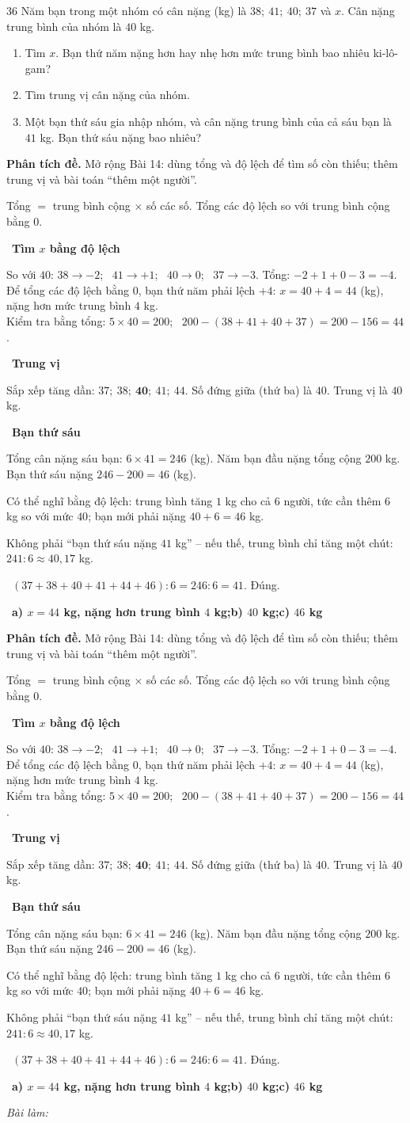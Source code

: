 \documentclass[11pt]{article}
\newif\ifsol \soltrue
\providecommand{\AnsWord}{Đáp số}
\newcommand{\ans}[1]{\par\smallskip{\bfseries\color{tmGreen!88!black}\AnsWord:}\ {\bfseries\color{AnsRed}#1}\par}
\newcommand{\probsol}[1]{%
  \begin{lrbox}{\solmeasure}\begin{minipage}{\dimexpr\linewidth-24pt\relax}#1\end{minipage}\end{lrbox}%
  \ifsol
    \begin{solbox}#1\end{solbox}%
  \else
    \setlength{\solht}{\dimexpr\ht\solmeasure+\dp\solmeasure+0.85cm\relax}%
    \ifdim\solht<1.35cm\setlength{\solht}{1.35cm}\fi
    \ifdim\solht>\StudentMaxWork\setlength{\solht}{\StudentMaxWork}\fi
    \begin{tcolorbox}[colback=white,colframe=Line,boxrule=0.8pt,arc=5pt,
      left=8pt,right=8pt,top=4pt,bottom=4pt,height=\solht]{\footnotesize\color{Slate}\itshape\WorkWord}\end{tcolorbox}%
  \fi}
\newlength{\StudentMaxWork}\setlength{\StudentMaxWork}{7.5cm}
\newcommand{\step}[2]{\par\smallskip\noindent{\bfseries\color{tmBlue!85!black}\StepWord~#1.}\ {\bfseries #2}\par\nopagebreak}
\newcommand{\verify}[1]{\par\smallskip\noindent{\bfseries\color{tmGreen!80!black}\faCheckCircle\ \CheckWord}\ #1\par}
\def\WorkWord{Bài làm:}
\def\AnsWord{Đáp số}
\def\StepWord{Bước}
\def\CheckWord{Thử lại:}
\begin{document}
\begin{probbox}{36}{\relax}
Năm bạn trong một nhóm có cân nặng (kg) là $38;\ 41;\ 40;\ 37$ và $x$. Cân nặng trung bình của nhóm là $40$ kg.
\begin{enumerate}[label=\alph*),leftmargin=1.6em,itemsep=0pt,topsep=2pt]
  \item Tìm $x$. Bạn thứ năm nặng hơn hay nhẹ hơn mức trung bình bao nhiêu ki-lô-gam?
  \item Tìm trung vị cân nặng của nhóm.
  \item Một bạn thứ sáu gia nhập nhóm, và cân nặng trung bình của cả sáu bạn là $41$ kg. Bạn thứ sáu nặng bao nhiêu?
\end{enumerate}
\end{probbox}
\probsol{
\textbf{Phân tích đề.} Mở rộng Bài 14: dùng tổng và độ lệch để tìm số còn thiếu; thêm trung vị và bài toán ``thêm một người''.
\begin{recallbox}Tổng $=$ trung bình cộng $\times$ số các số. Tổng các độ lệch so với trung bình cộng bằng $0$.\end{recallbox}
\step{1}{Tìm $x$ bằng độ lệch}
So với $40$: $38 \to -2$; \ $41 \to +1$; \ $40 \to 0$; \ $37 \to -3$. Tổng: $-2 + 1 + 0 - 3 = -4$.\\
Để tổng các độ lệch bằng $0$, bạn thứ năm phải lệch $+4$: $x = 40 + 4 = 44$ (kg), nặng hơn mức trung bình $4$ kg.\\
Kiểm tra bằng tổng: $5\times 40 = 200$; \ $200 - (38 + 41 + 40 + 37) = 200 - 156 = 44$.
\step{2}{Trung vị}
Sắp xếp tăng dần: $37;\ 38;\ \mathbf{40};\ 41;\ 44$. Số đứng giữa (thứ ba) là $40$. Trung vị là $40$ kg.
\step{3}{Bạn thứ sáu}
Tổng cân nặng sáu bạn: $6\times 41 = 246$ (kg). Năm bạn đầu nặng tổng cộng $200$ kg. Bạn thứ sáu nặng $246 - 200 = 46$ (kg).
\begin{tipbox}Có thể nghĩ bằng độ lệch: trung bình tăng $1$ kg cho cả $6$ người, tức cần thêm $6$ kg so với mức $40$;
bạn mới phải nặng $40 + 6 = 46$ kg.\end{tipbox}
\begin{warnbox}Không phải ``bạn thứ sáu nặng $41$ kg'' -- nếu thế, trung bình chỉ tăng một chút: $241 : 6 \approx 40{,}17$ kg.\end{warnbox}
\verify{$(37 + 38 + 40 + 41 + 44 + 46) : 6 = 246 : 6 = 41$. Đúng.}
\ans{a) $x = 44$ kg, nặng hơn trung bình $4$ kg;\quad b) $40$ kg;\quad c) $46$ kg}
}
\end{document}
